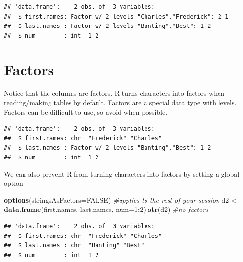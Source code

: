 \documentclass[]{article}
\newenvironment{Shaded}{\begin{snugshade}}{\end{snugshade}}
\newcommand{\KeywordTok}[1]{\textcolor[rgb]{0.13,0.29,0.53}{\textbf{#1}}}
\newcommand{\DataTypeTok}[1]{\textcolor[rgb]{0.13,0.29,0.53}{#1}}
\newcommand{\DecValTok}[1]{\textcolor[rgb]{0.00,0.00,0.81}{#1}}
\newcommand{\StringTok}[1]{\textcolor[rgb]{0.31,0.60,0.02}{#1}}
\newcommand{\CommentTok}[1]{\textcolor[rgb]{0.56,0.35,0.01}{\textit{#1}}}
\newcommand{\OtherTok}[1]{\textcolor[rgb]{0.56,0.35,0.01}{#1}}
\newcommand{\OperatorTok}[1]{\textcolor[rgb]{0.81,0.36,0.00}{\textbf{#1}}}
\newcommand{\NormalTok}[1]{#1}
\begin{document}
\begin{verbatim}
## 'data.frame':    2 obs. of  3 variables:
##  $ first.names: Factor w/ 2 levels "Charles","Frederick": 2 1
##  $ last.names : Factor w/ 2 levels "Banting","Best": 1 2
##  $ num        : int  1 2
\end{verbatim}

\section{Factors}\label{factors}

Notice that the columns are factors. R turns characters into factors
when reading/making tables by default. Factors are a special data type
with levels. Factors can be difficult to use, so avoid when possible.

\begin{Shaded}
\end{Shaded}

\begin{verbatim}
## 'data.frame':    2 obs. of  3 variables:
##  $ first.names: chr  "Frederick" "Charles"
##  $ last.names : Factor w/ 2 levels "Banting","Best": 1 2
##  $ num        : int  1 2
\end{verbatim}

We can also prevent R from turning characters into factors by setting a
global option

\begin{Shaded}
\begin{Highlighting}[]
\KeywordTok{options}\NormalTok{(}\DataTypeTok{stringsAsFactors=}\OtherTok{FALSE}\NormalTok{) }\CommentTok{#applies to the rest of your session}
\NormalTok{d2 <-}\StringTok{ }\KeywordTok{data.frame}\NormalTok{(first.names, last.names, }\DataTypeTok{num=}\DecValTok{1}\OperatorTok{:}\DecValTok{2}\NormalTok{)}
\KeywordTok{str}\NormalTok{(d2) }\CommentTok{#no factors}
\end{Highlighting}
\end{Shaded}

\begin{verbatim}
## 'data.frame':    2 obs. of  3 variables:
##  $ first.names: chr  "Frederick" "Charles"
##  $ last.names : chr  "Banting" "Best"
##  $ num        : int  1 2
\end{verbatim}
\end{document}
